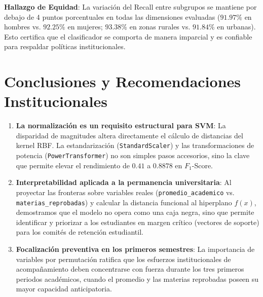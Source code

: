 \documentclass[12pt,a4paper]{article}
\begin{document}
\textbf{Hallazgo de Equidad}: La variación del Recall entre subgrupos se mantiene por debajo de 4 puntos porcentuales en todas las dimensiones evaluadas ($91.97\%$ en hombres vs. $92.25\%$ en mujeres; $93.38\%$ en zonas rurales vs. $91.84\%$ en urbanas). Esto certifica que el clasificador se comporta de manera imparcial y es confiable para respaldar políticas institucionales.

\section{Conclusiones y Recomendaciones Institucionales}

\begin{enumerate}
    \item \textbf{La normalización es un requisito estructural para SVM}: La disparidad de magnitudes altera directamente el cálculo de distancias del kernel RBF. La estandarización (\texttt{StandardScaler}) y las transformaciones de potencia (\texttt{PowerTransformer}) no son simples pasos accesorios, sino la clave que permite elevar el rendimiento de $0.41$ a $0.8878$ en $F_1$-Score.
    \item \textbf{Interpretabilidad aplicada a la permanencia universitaria}: Al proyectar las fronteras sobre variables reales (\texttt{promedio\_academico} vs. \texttt{materias\_reprobadas}) y calcular la distancia funcional al hiperplano $f(x)$, demostramos que el modelo no opera como una caja negra, sino que permite identificar y priorizar a los estudiantes en margen crítico (vectores de soporte) para los comités de retención estudiantil.
    \item \textbf{Focalización preventiva en los primeros semestres}: La importancia de variables por permutación ratifica que los esfuerzos institucionales de acompañamiento deben concentrarse con fuerza durante los tres primeros periodos académicos, cuando el promedio y las materias reprobadas poseen su mayor capacidad anticipatoria.
\end{enumerate}

\vspace{0.4cm}
\end{document}
